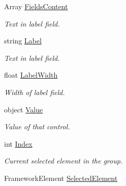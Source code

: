 \begin{DoxyCompactItemize}
Array \mbox{\hyperlink{class_wpf_handler_1_1_u_i_1_1_controls_1_1_flat_toggles_group_a48c85f0f2ca803d28b95877dbc0122f0}{Fields\+Content}}
\begin{DoxyCompactList}\small\item\em Text in label field. \end{DoxyCompactList}\item 
string \mbox{\hyperlink{class_wpf_handler_1_1_u_i_1_1_controls_1_1_flat_toggles_group_a49e224a3505a7214029943dd421e4cd6}{Label}}
\begin{DoxyCompactList}\small\item\em Text in label field. \end{DoxyCompactList}\item 
float \mbox{\hyperlink{class_wpf_handler_1_1_u_i_1_1_controls_1_1_flat_toggles_group_a183897b270682950d9a7fa6cc8bd7e0f}{Label\+Width}}
\begin{DoxyCompactList}\small\item\em Width of label field. \end{DoxyCompactList}\item 
object \mbox{\hyperlink{class_wpf_handler_1_1_u_i_1_1_controls_1_1_flat_toggles_group_a699f90c459005d9501720e719859ba96}{Value}}
\begin{DoxyCompactList}\small\item\em Value of that control. \end{DoxyCompactList}\item 
int \mbox{\hyperlink{class_wpf_handler_1_1_u_i_1_1_controls_1_1_flat_toggles_group_a89cc073c7cd5761d1700f8d545ae72df}{Index}}
\begin{DoxyCompactList}\small\item\em Current selected element in the group. \end{DoxyCompactList}\item 
Framework\+Element \mbox{\hyperlink{class_wpf_handler_1_1_u_i_1_1_controls_1_1_flat_toggles_group_a32cdb6b0e4be63ed1465645f6ea7b16b}{Selected\+Element}}

\end{DoxyCompactItemize}
